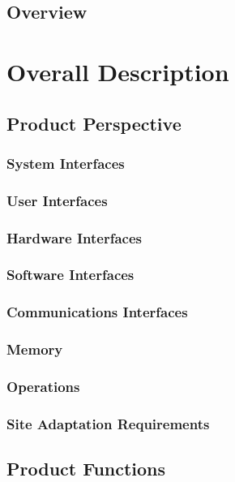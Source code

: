 \documentclass[a4paper,10pt]{article}
\begin{document}
	\subsection{Overview} 

\section{Overall Description}

	\subsection{Product Perspective}
	
		\subsubsection{System Interfaces}

		\subsubsection{User Interfaces}

		\subsubsection{Hardware Interfaces}

		\subsubsection{Software Interfaces}

		\subsubsection{Communications Interfaces}
	
		\subsubsection{Memory}

		\subsubsection{Operations}

		\subsubsection{Site Adaptation Requirements}
		
	\subsection{Product Functions}			
					
\end{document}

